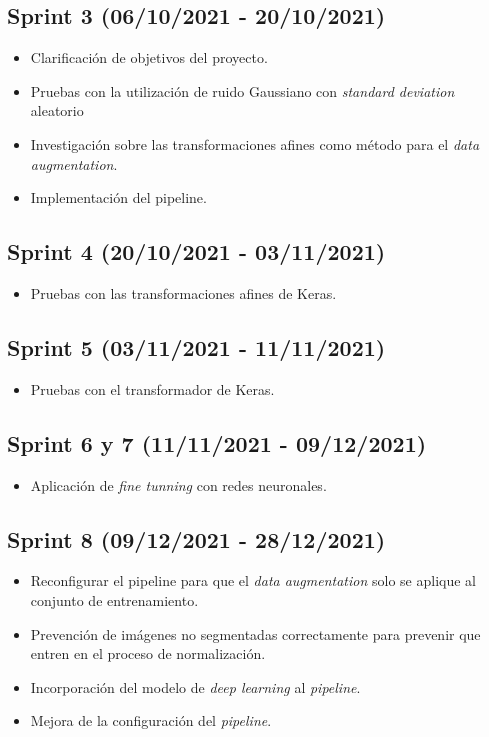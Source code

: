 \subsection{Sprint 3 (06/10/2021 - 20/10/2021)}

\begin{itemize}
\item Clarificación de objetivos del proyecto.
\item Pruebas con la utilización de ruido Gaussiano con \textit{standard deviation} aleatorio
\item Investigación sobre las transformaciones afines como método para el \textit{data augmentation}.
\item Implementación del pipeline.
\end{itemize}

\subsection{Sprint 4 (20/10/2021 - 03/11/2021)}

\begin{itemize}
\item Pruebas con las transformaciones afines de Keras.
\end{itemize}

\subsection{Sprint 5 (03/11/2021 - 11/11/2021)}

\begin{itemize}
\item Pruebas con el transformador de Keras.
\end{itemize}

\subsection{Sprint 6 y 7 (11/11/2021 - 09/12/2021)}

\begin{itemize}
\item Aplicación de \textit{fine tunning} con redes neuronales.
\end{itemize}

\subsection{Sprint 8 (09/12/2021 - 28/12/2021)}

\begin{itemize}
\item Reconfigurar el pipeline para que el \textit{data augmentation} solo se aplique al conjunto de entrenamiento.
\item Prevención de imágenes no segmentadas correctamente para prevenir que entren en el proceso de normalización.
\item Incorporación del modelo de \textit{deep learning} al \textit{pipeline}.
\item Mejora de la configuración del \textit{pipeline}.
\end{itemize}

